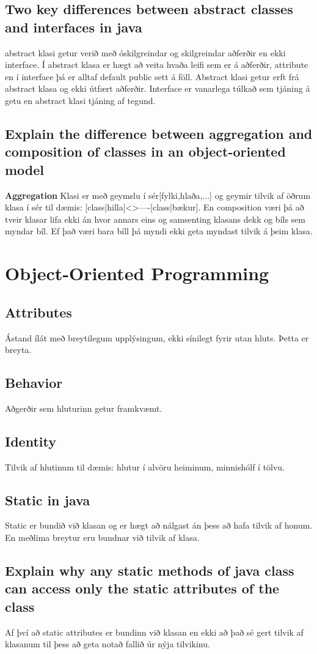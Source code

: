 \documentclass[openany]{article}
\begin{document}
\subsection{Two key differences between abstract classes and interfaces in java}
abstract klasi getur verið með óskilgreindar og skilgreindar aðferðir en ekki interface. Í abstract klasa er hægt að veita hvaða leifi sem er á aðferðir, attribute en í interface þá er alltaf default public sett á föll. Abstract klasi getur erft frá abstract klasa og ekki útfært aðferðir. Interface er vanarlega túlkað sem tjáning á getu en abstract klasi tjáning af tegund.
\subsection{Explain the difference between aggregation and composition of classes in an object-oriented model}
\textbf{Aggregation} Klasi er með geymslu í sér[fylki,hlaða,...] og geymir tilvik af öðrum klasa í sér til dæmis: [class|hilla]<>----[class|bækur]. En composition væri þá að tveir klasar lifa ekki án hvor annars eins og samsenting klasans dekk og bíls sem myndar bíl. Ef það væri bara bíll þá myndi ekki geta myndast tilvik á þeim klasa.
\section{Object-Oriented Programming}
\subsection{Attributes}
Ástand ílát með breytilegum upplýsingum, ekki sínilegt fyrir utan hluts. Þetta er breyta.
\subsection{Behavior}
Aðgerðir sem hluturinn getur framkvæmt.
\subsection{Identity}
Tilvik af hlutinum til dæmis: hlutur í alvöru heiminum, minnishólf í tölvu.
\subsection{Static in java}
Static er bundið við klasan og er hægt að nálgast án þess að hafa tilvik af honum. En meðlima breytur eru bundnar við tilvik af klasa.
\subsection{Explain why any static methods of java class can access only the static attributes of the class}
Af því að static attributes er bundinn við klasan en ekki að það sé gert tilvik af klasanum til þess að geta notað fallið úr nýja tilvikinu.
\end{document}
